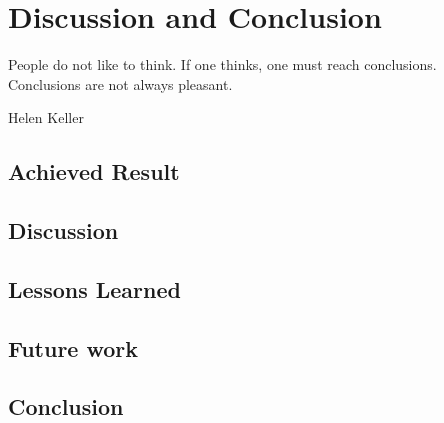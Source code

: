\chapter{Discussion and Conclusion}
\epigraph{People do not like to think. If one thinks, one must reach conclusions. Conclusions are not always pleasant.}{Helen Keller}
\section{Achieved Result}

\section{Discussion}

\section{Lessons Learned}

\section{Future work}

\section{Conclusion}
